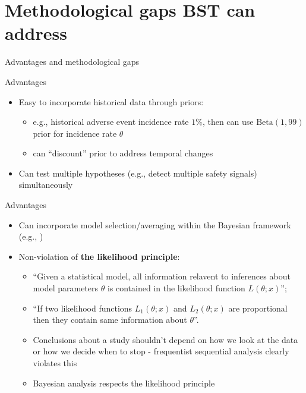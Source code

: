 \documentclass[xcolor=dvipsnames]{beamer}
\begin{document}
\section{Methodological gaps BST can address}

\begin{frame}
    \Huge{\centerline{Advantages and methodological gaps}}
\end{frame}  

\begin{frame}{Advantages}
\begin{itemize}
    \item Easy to incorporate historical data through priors:
    \begin{itemize}
        \item e.g., historical adverse event incidence rate $1\%$, then can use $\text{Beta}(1,99)$ prior for incidence rate $\theta$
        \item can ``discount'' prior to address temporal changes \cite{west2006bayesian}
    \end{itemize}
    \pause
    \item Can test multiple hypotheses (e.g., detect multiple safety signals) simultaneously \cite{gopalan1998bayesian,berry1999bayesian,scott2006exploration,labbe2007multiple,guo2010multiplicity,kachiashvili2012sensitivity,kachiashvili2013conditional,kachiashvili2014methods,berger2013statistical}
\end{itemize}
    
\end{frame}

\begin{frame}{Advantages}
\begin{itemize}
    \item Can incorporate model selection/averaging within the Bayesian framework (e.g., \cite{raftery1995bayesian,wasserman2000bayesian,chipman2001practical,stephan2009bayesian,wathen2008bayesian,senarathne2020laplace})
    \item Non-violation of \textbf{the likelihood principle}:
    \begin{itemize}
        \item ``Given a statistical model, all information relavent to inferences about model parameters $\theta$ is contained in the likelihood function $L(\theta ; x)$'';
        \item ``If two likelihood functions $L_1(\theta ; x)$ and $L_2(\theta ; x)$ are proportional then they contain same information about $\theta$''.
        \item Conclusions about a study shouldn't depend on how we look at the data or how we decide when to stop - frequentist sequential analysis clearly violates this
        \item Bayesian analysis respects the likelihood principle
    \end{itemize}

\end{itemize}
    
\end{frame}
\end{document}

